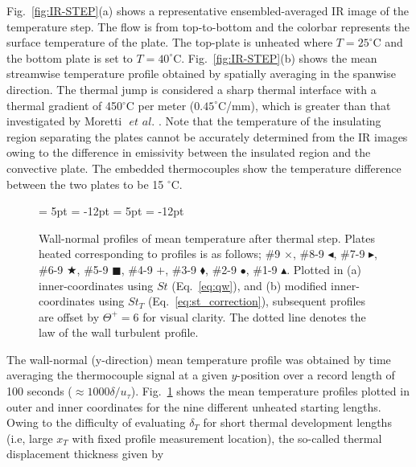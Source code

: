 Fig.~\ref{fig:IR-STEP}(a) shows a representative ensembled-averaged IR image of the temperature step. 
The flow is from top-to-bottom and the colorbar represents the surface temperature of the plate. The top-plate is unheated where $T=25^\circ$C and the bottom plate is set to $T=40^\circ$C.  
Fig.~\ref{fig:IR-STEP}(b) shows the mean streamwise temperature profile obtained by spatially averaging in the spanwise direction. 
The thermal jump is considered a sharp thermal interface with a thermal gradient of 450$^\circ$C per meter ($0.45^\circ$C/mm), which is greater than that investigated by Moretti $\textit{ et al.}$ \cite{Moretti1965}. 
Note that the temperature of the insulating region separating the plates cannot be accurately determined from the IR images owing to the difference in emissivity between the insulated region and the convective plate. 
The embedded thermocouples show the temperature difference between the two plates to be 15 $^\circ$C.  

\begin{figure}[h]
  \begin{center}
  {\subfigcapskip = 5pt \subfigcapmargin = -12pt }
   {\subfigcapskip = 5pt \subfigcapmargin = -12pt  }
  \end{center}
 \caption{Wall-normal profiles of mean temperature after thermal step. Plates heated corresponding to profiles is as follows; $\#$9 {\color{green} $\times$}, $\#$8-9 {\color{blue} $\blacktriangleleft$}, $\#$7-9 {\color{red} $\blacktriangleright$}, $\#$6-9 {\color{purple} $\bigstar$}, $\#$5-9 {\color{red} $\blacksquare$}, $\#$4-9 {\color{green} $+$}, $\#$3-9 {\color{blue} $\blacklozenge$}, $\#$2-9 {\color{red} $\bullet$}, $\#$1-9 {\color{purple} $\blacktriangle$}. Plotted in (a) inner-coordinates using $St$ (Eq.~\ref{eq:qw}), and (b) modified inner-coordinates using $St_T$ (Eq.~\ref{eq:st_correction}), subsequent profiles are offset by $\Theta^+=6$ for visual clarity. The dotted line denotes the law of the wall turbulent profile.}
\label{fig:Step-temp}
\end{figure}


The wall-normal (y-direction) mean temperature profile was obtained by time averaging the thermocouple signal at a given $y$-position over a record length of 100 seconds ($\approx1000 \delta/u_\tau$).
Fig.~\ref{fig:Step-temp} shows the mean temperature profiles plotted in outer and inner coordinates for the nine different unheated starting lengths. 
Owing to the difficulty of evaluating $\delta_T$ for short thermal development lengths (i.e, large $x_T$ with fixed profile measurement location), the so-called thermal displacement thickness given by 

